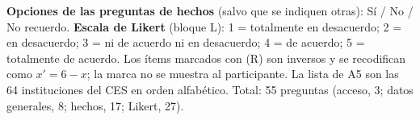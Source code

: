 
\noindent\textbf{Opciones de las preguntas de hechos} (salvo que se indiquen otras): Sí / No / No recuerdo. \textbf{Escala de Likert} (bloque L): 1 = totalmente en desacuerdo; 2 = en desacuerdo; 3 = ni de acuerdo ni en desacuerdo; 4 = de acuerdo; 5 = totalmente de acuerdo. Los ítems marcados con (R) son inversos y se recodifican como $x' = 6 - x$; la marca no se muestra al participante. La lista de A5 son las 64 instituciones del CES en orden alfabético. Total: 55 preguntas (acceso, 3; datos generales, 8; hechos, 17; Likert, 27).

